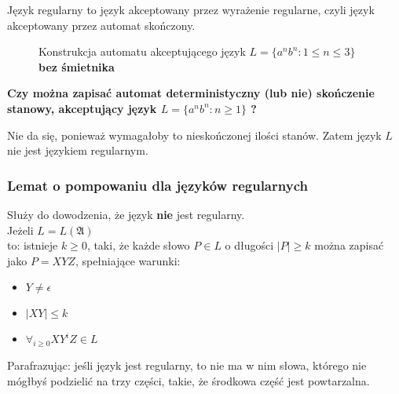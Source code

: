 \documentclass{../notatki}
\begin{document}
Język regularny to język akceptowany przez wyrażenie regularne, czyli język akceptowany przez automat skończony.

\begin{figure}[H]
    \centering
    \caption{Konstrukcja automatu akceptującego język $L = \{a^nb^n : 1 \le n \le 3\}$ \textbf{bez śmietnika}}
    \label{fig:cls:ex2}
\end{figure}

\par \noindent \textbf{Czy można zapisać automat deterministyczny (lub nie) skończenie stanowy, akceptujący język $L = \{a^nb^n : n \ge 1\}$ ?}

Nie da się, ponieważ wymagałoby to nieskończonej ilości stanów. Zatem język $L$ nie jest językiem regularnym.

\subsubsection{Lemat o pompowaniu dla języków regularnych}

Służy do dowodzenia, że język \textbf{nie} jest regularny. \\
Jeżeli $L = L(\mathfrak{A})$\\to: istnieje $k \ge 0$, taki, że każde słowo $P \in L$ o długości $|P| \ge k$ można zapisać jako $P = XYZ$, spełniające warunki:\\
\begin{itemize}
    \item $Y \ne \epsilon$
    \item $|XY| \le k$
    \item $\forall_{i \ge 0} XY^iZ \in L$
\end{itemize}
Parafrazując: jeśli język jest regularny, to nie ma w nim słowa, którego nie mógłbyś podzielić na trzy części, takie, że środkowa część jest powtarzalna. \\
\end{document}
